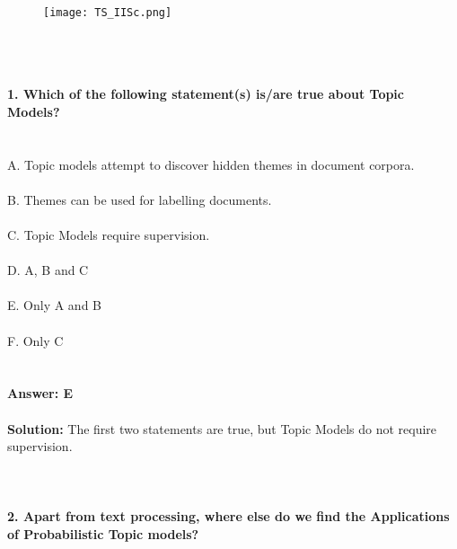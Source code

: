 \documentclass[prl,twocolumn,showpacs,preprintnumbers,superscriptaddress]{revtex4}
\theoremstyle{plain}
\theoremstyle{definition}
\begin{document}
\begin{widetext}
\\
\\
\\

\begin{wrapfigure}
\centering
\end{wrapfigure}
\begin{figure}[h!]
 \begin{right}
  \hfill\texttt{[image: TS\_IISc.png]}
 \end{right}
\end{figure}
\\
\\
\\
\noindent\textbf{1. Which of the following statement(s) is/are true about Topic Models?}
\\
\\
\\
\noindent A. Topic models attempt to discover hidden themes in document corpora.
\\
\\
B. Themes can be used for labelling documents. 
\\
\\
C. Topic Models require supervision.
\\
\\
D. A, B and C
\\
\\
E. Only A and B
\\
\\
F. Only C
\\
\\
\\
\textbf{Answer: E}
\\
\\
\textbf{Solution:} The first two statements are true, but Topic Models do not require supervision.
\\
\\
\\
\\
\textbf{2. Apart from text processing, where else do we find the Applications of Probabilistic Topic models?}
\\
\\

\end{widetext}
\end{document}
